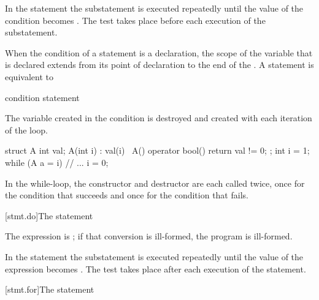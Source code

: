 \pnum
In the  statement the substatement is executed repeatedly
until the value of the condition becomes
. The test takes place before each execution of the
substatement.

\pnum
{}%
When the condition of a  statement is a declaration, the scope of
the variable that is declared extends from its point of
declaration to the end of the 
. A  statement is equivalent to
\begin{ncsimplebnf}
 \terminal{:}\br
\terminal{\{}\br
\bnfindent {} \terminal{(} condition \terminal{)} \terminal{\{}\br
\bnfindent \bnfindent statement\br
\bnfindent \bnfindent {}  \terminal{;}\br
\bnfindent \terminal{\}}\br
\terminal{\}}
\end{ncsimplebnf}
\begin{note}
The variable created in the condition is destroyed and created with each
iteration of the loop.
\begin{example}
\begin{codeblock}
struct A {
  int val;
  A(int i) : val(i) { }
  ~A() { }
  operator bool() { return val != 0; }
};
int i = 1;
while (A a = i) {
  // ...
  i = 0;
}
\end{codeblock}
In the while-loop, the constructor and destructor are each called twice,
once for the condition that succeeds and once for the condition that
fails.
\end{example}
\end{note}

[stmt.do]{The  statement}%

\pnum
The expression is ;
if that conversion is ill-formed, the program is ill-formed.

\pnum
In the  statement the substatement is executed repeatedly
until the value of the expression becomes . The test takes
place after each execution of the statement.

[stmt.for]{The  statement}%

